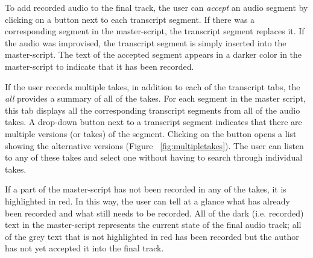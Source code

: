 
To add recorded audio to the final track, the user can \textit{accept} an audio segment by clicking on a button next to each transcript segment. If there was a corresponding segment in the master-script, the transcript segment replaces it. If the audio was improvised, the transcript segment is simply inserted into the master-script.  The text of the accepted segment appears in a darker color in the master-script to indicate that it has been recorded.



If the user records multiple takes, in addition to each of the transcript tabs, the \textit{all} provides a summary of all of the takes. For each segment in the master script, this tab displays all the corresponding transcript segments from all of the audio takes. A drop-down button next to a transcript segment  indicates that there are multiple versions (or takes)  of the  segment. Clicking on the button opens a list showing the alternative versions (Figure ~\ref{fig:multipletakes}). The user can listen to any of these takes and select one without having to search through individual takes. 

If a part of the master-script has not been recorded in any of the takes, it is highlighted in red. In this way, the user can tell at a glance what has already been recorded and what still needs to be recorded. All of the dark (i.e. recorded) text in the master-script represents the current state of the final audio track; all of the grey text that is not highlighted in red has been recorded but the author has not yet accepted it into the final track. 

